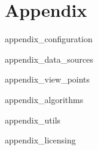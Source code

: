 \chapter{Appendix}
\label{sec:appendix}

 {appendix_configuration}

 {appendix_data_sources}

 {appendix_view_points}

 {appendix_algorithms}

 {appendix_utils}

 {appendix_licensing} 

